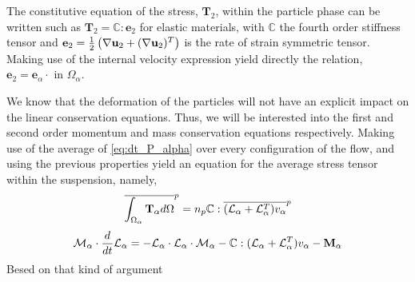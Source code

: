 {The constitutive equation of the stress, $\textbf{T}_2$, within the particle phase can be written such as $\textbf{T}_2 = \mathbb{C} : \textbf{e}_2$ for elastic materials, with $\mathbb{C}$ the fourth order stiffness tensor and $ \textbf{e}_2 = \frac{1}{2}\left(\mathbf{\nabla}\textbf{u}_2+(\mathbf{\nabla}\textbf{u}_2)^T\right)$ is the rate of strain symmetric tensor. 
Making use of the internal velocity expression yield directly the relation, $\textbf{e}_2=\textbf{e}_\alpha\cdot$ in $\Omega_\alpha$. 

We know that the deformation of the particles will not have an explicit impact on the linear conservation equations.
Thus, we will be interested into the first and second order momentum and mass conservation equations respectively.   
Making use of the average of \ref{eq:dt_P_alpha} over every configuration of the flow, and using the previous properties yield an equation for the average stress tensor within the suspension, namely, 
\begin{equation}
    \overline{\int_{\Omega_\alpha}\textbf{T}_\alpha d\Omega}^{p}
    = n_p\mathbb{C} : \overline{(\mathcal{L}_\alpha+ \mathcal{L}_\alpha^T) v_\alpha}^{p}
    \label{eq:hybrid_avg_dt_P_alpha}
\end{equation}
\begin{equation}
    \mathcal{M}_\alpha \cdot\frac{d}{d t} \mathcal{L}_\alpha
    = - \mathcal{L}_\alpha\cdot \mathcal{L}_\alpha\cdot \mathcal{M}_\alpha
    - \mathbb{C} : (\mathcal{L}_\alpha+ \mathcal{L}_\alpha^T) v_\alpha
    - \textbf{M}_\alpha
    \label{eq:hybrid_avg_dt_P_alpha}
\end{equation}
Besed on that kind of argument \citet{lhuillier1987phenomenology}
}